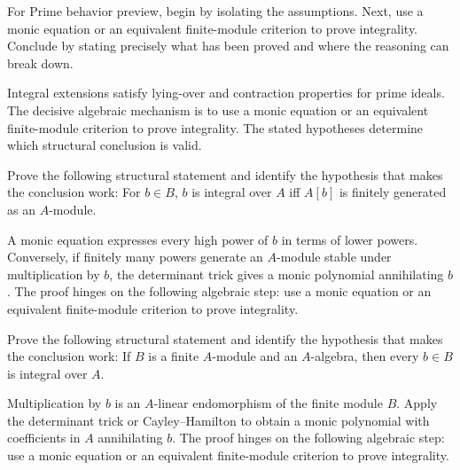\begin{problem}\label{prob:v19-problem-08}
For Prime behavior preview, begin by isolating the assumptions. Next, use a monic equation or an equivalent finite-module criterion to prove integrality. Conclude by stating precisely what has been proved and where the reasoning can break down.
\end{problem}
\begin{solution}
Integral extensions satisfy lying-over and contraction properties for prime ideals. The decisive algebraic mechanism is to use a monic equation or an equivalent finite-module criterion to prove integrality. The stated hypotheses determine which structural conclusion is valid.
\end{solution}

\begin{problem}\label{prob:v19-problem-09}
Prove the following structural statement and identify the hypothesis that makes the conclusion work: For $b\in B$, $b$ is integral over $A$ iff $A[b]$ is finitely generated as an $A$-module.
\end{problem}
\begin{solution}
A monic equation expresses every high power of $b$ in terms of lower powers. Conversely, if finitely many powers generate an $A$-module stable under multiplication by $b$, the determinant trick gives a monic polynomial annihilating $b$. The proof hinges on the following algebraic step: use a monic equation or an equivalent finite-module criterion to prove integrality.
\end{solution}

\begin{problem}\label{prob:v19-problem-10}
Prove the following structural statement and identify the hypothesis that makes the conclusion work: If $B$ is a finite $A$-module and an $A$-algebra, then every $b\in B$ is integral over $A$.
\end{problem}
\begin{solution}
Multiplication by $b$ is an $A$-linear endomorphism of the finite module $B$. Apply the determinant trick or Cayley--Hamilton to obtain a monic polynomial with coefficients in $A$ annihilating $b$. The proof hinges on the following algebraic step: use a monic equation or an equivalent finite-module criterion to prove integrality.
\end{solution}

